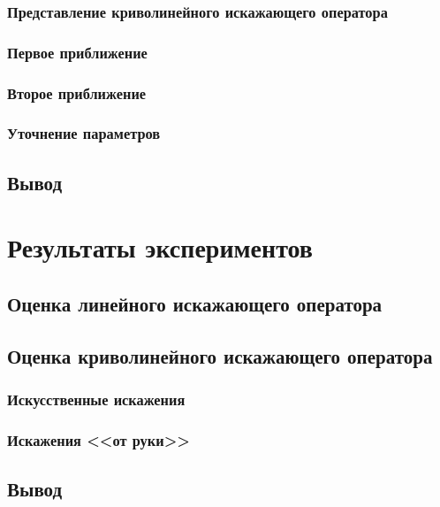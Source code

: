 \subsection{Представление криволинейного искажающего оператора}
\subsection{Первое приближение}
\subsection{Второе приближение}
\subsection{Уточнение параметров}
\section{Вывод}



\chapter{Результаты экспериментов}
\section{Оценка линейного искажающего оператора}
\section{Оценка криволинейного искажающего оператора}
\subsection{Искусственные искажения}
\subsection{Искажения <<от руки>>}
\section{Вывод}
